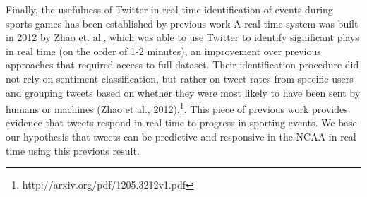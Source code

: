 \documentclass[12pt]{article}
\begin{document}
\begin{doublespacing}
Finally, the usefulness of Twitter in real-time
identification of events during sports games
has been established by previous work
A real-time system was built in 2012 by Zhao et. al., 
which was able to use Twitter to identify significant
plays in real time (on the order of 1-2 minutes), an
improvement over previous approaches that required
access to full dataset. Their identification procedure
did not rely on sentiment classification, but rather
on tweet rates from specific users and grouping 
tweets based on whether they were most likely to have 
been sent by humans or machines (Zhao et al., 2012).\footnote{http://arxiv.org/pdf/1205.3212v1.pdf}. 
This piece of 
previous work provides evidence that tweets respond in
real time to progress in sporting events. We base
our hypothesis that tweets can be predictive and responsive
in the NCAA in real time using this previous result. 

\end{doublespacing}
\end{document}
